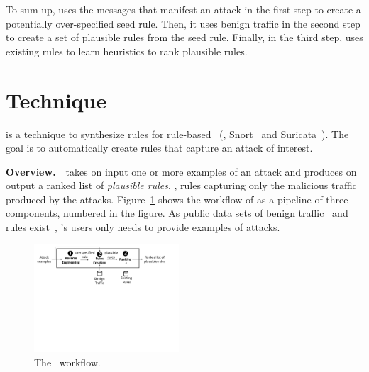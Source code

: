 \documentclass[conference]{IEEEtran}
\begin{document}
To sum up, \tname{} uses the messages that manifest an attack in the
first step to create a potentially over-specified seed rule. Then, it
uses benign traffic in the second step to create a set of plausible
rules from the seed rule. Finally, in the third step, \tname{} uses
existing rules to learn heuristics to rank plausible rules.

\section{Technique}
\label{sec:technique}

\tname{} is a technique to synthesize rules for rule-based
\nids~(\eg{}, Snort~\cite{snort} and Suricata~\cite{suricata}). The
goal is to automatically create rules that capture an attack of
interest.

\vspace{1ex}
\noindent\textbf{Overview.}~\tname\ takes on input one or more
examples of an attack and produces on output a ranked list of
\emph{plausible rules}, \ie{}, rules capturing only the malicious
traffic produced by the attacks. Figure~\ref{fig:overview} shows the
workflow of \tname{} as a pipeline of three components, numbered in
the figure. As public data sets of benign
traffic~\cite{tcpreplay,stratosphere-normal} and rules
exist~\cite{emerging-threats-open}, \tname{}'s users only needs to
provide examples of attacks.


\begin{figure}[t!]
  \centering
  \includegraphics[trim=0 340 50 0,clip,width=0.48\textwidth]{figs/nids-workflow}
  \caption{The \tname\ workflow.}
  \label{fig:overview}
  \vspace{-4ex}
\end{figure}

\end{document}
